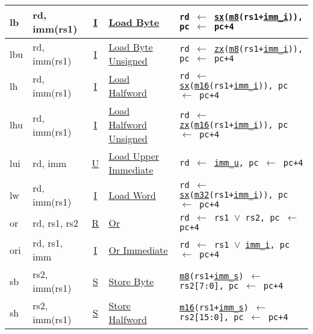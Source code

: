 {\begin{tabular}{|ll|c|l|l|}
\hline
lb    & rd, imm(rs1)  & \hyperref[insnformat:itype]{I} & \hyperref[insn:lb]{Load Byte}                   & {\tt rd $\leftarrow$ \hyperref[extension:sx]{sx}(\hyperref[memory:m8]{m8}(rs1+\hyperref[imm.i:decode]{imm\_i})), pc $\leftarrow$ pc+4}\\
\hline
lbu   & rd, imm(rs1)  & \hyperref[insnformat:itype]{I} & \hyperref[insn:lbu]{Load Byte Unsigned}         & {\tt rd $\leftarrow$ \hyperref[extension:zx]{zx}(\hyperref[memory:m8]{m8}(rs1+\hyperref[imm.i:decode]{imm\_i})), pc $\leftarrow$ pc+4}\\
\hline
lh    & rd, imm(rs1)  & \hyperref[insnformat:itype]{I} & \hyperref[insn:lh]{Load Halfword}               & {\tt rd $\leftarrow$ \hyperref[extension:sx]{sx}(\hyperref[memory:m16]{m16}(rs1+\hyperref[imm.i:decode]{imm\_i})), pc $\leftarrow$ pc+4}\\
\hline
lhu   & rd, imm(rs1)  & \hyperref[insnformat:itype]{I} & \hyperref[insn:lhu]{Load Halfword Unsigned}     & {\tt rd $\leftarrow$ \hyperref[extension:zx]{zx}(\hyperref[memory:m16]{m16}(rs1+\hyperref[imm.i:decode]{imm\_i})), pc $\leftarrow$ pc+4}\\
\hline
lui   & rd, imm        & \hyperref[insnformat:utype]{U} & \hyperref[insn:lui]{Load Upper Immediate}        & {\tt rd $\leftarrow$ \hyperref[imm.u:decode]{imm\_u}, pc $\leftarrow$ pc+4}\\
\hline
lw    & rd, imm(rs1)  & \hyperref[insnformat:itype]{I} & \hyperref[insn:lw]{Load Word}                   & {\tt rd $\leftarrow$ \hyperref[extension:sx]{sx}(\hyperref[memory:m32]{m32}(rs1+\hyperref[imm.i:decode]{imm\_i})), pc $\leftarrow$ pc+4}\\
\hline
or    & rd, rs1, rs2   & \hyperref[insnformat:rtype]{R} & \hyperref[insn:or]{Or}                         & {\tt rd $\leftarrow$ rs1 $\lor$ rs2, pc $\leftarrow$ pc+4}\\
\hline
ori   & rd, rs1, imm  & \hyperref[insnformat:itype]{I} & \hyperref[insn:ori]{Or Immediate}               & {\tt rd $\leftarrow$ rs1 $\lor$ \hyperref[imm.i:decode]{imm\_i}, pc $\leftarrow$ pc+4}\\
\hline
sb    & rs2, imm(rs1) & \hyperref[insnformat:stype]{S} & \hyperref[insn:sb]{Store Byte}                  & {\tt \hyperref[memory:m8]{m8}(rs1+\hyperref[imm.s:decode]{imm\_s}) $\leftarrow$ rs2[7:0], pc $\leftarrow$ pc+4}\\
\hline
sh    & rs2, imm(rs1) & \hyperref[insnformat:stype]{S} & \hyperref[insn:sh]{Store Halfword}              & {\tt \hyperref[memory:m16]{m16}(rs1+\hyperref[imm.s:decode]{imm\_s}) $\leftarrow$ rs2[15:0], pc $\leftarrow$ pc+4}\\

\end{tabular}}
